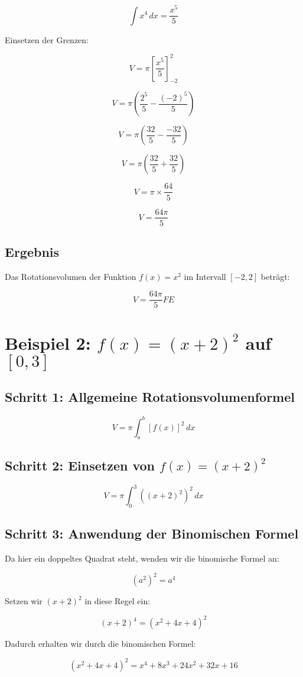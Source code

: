 \documentclass[a4paper,final]{report}
\begin{document}
\[
\int x^4 \, dx = \frac{x^5}{5}
\]

Einsetzen der Grenzen:

\[
V = \pi \left[ \frac{x^5}{5} \right]_{-2}^{2}
\]

\[
V = \pi \left( \frac{2^5}{5} - \frac{(-2)^5}{5} \right)
\]

\[
V = \pi \left( \frac{32}{5} - \frac{-32}{5} \right)
\]

\[
V = \pi \left( \frac{32}{5} + \frac{32}{5} \right)
\]

\[
V = \pi \times \frac{64}{5}
\]

\[
V = \frac{64\pi}{5}
\]

\subsection{Ergebnis}
Das Rotationsvolumen der Funktion \( f(x) = x^2 \) im Intervall \( [-2, 2] \) beträgt:

\[
V = \frac{64\pi}{5} FE
\]
\section{Beispiel 2: \( f(x) = (x+2)^2 \) auf \( [0,3] \)}

\subsection{Schritt 1: Allgemeine Rotationsvolumenformel}
\[
V = \pi \int_a^b [f(x)]^2 \, dx
\]

\subsection{Schritt 2: Einsetzen von \( f(x) = (x+2)^2 \)}
\[
V = \pi \int_{0}^{3} \left( (x+2)^2 \right)^2 \, dx
\]

\subsection{Schritt 3: Anwendung der Binomischen Formel}
Da hier ein doppeltes Quadrat steht, wenden wir die binomische Formel an:

\[
(a^2)^2 = a^4
\]

Setzen wir \( (x+2)^2 \) in diese Regel ein:

\[
(x+2)^4 = (x^2 + 4x + 4)^2
\]

Dadurch erhalten wir durch die binomischen Formel:

\[
(x^2 + 4x + 4)^2 = x^4 + 8x^3 + 24x^2 + 32x + 16
\]
\end{document}
